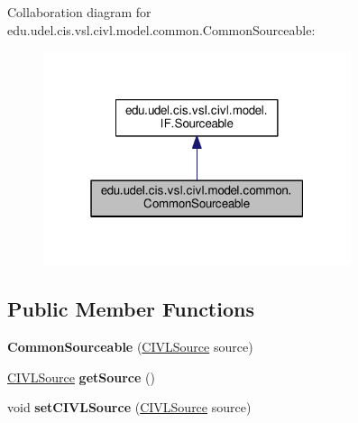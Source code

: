 Collaboration diagram for edu.\+udel.\+cis.\+vsl.\+civl.\+model.\+common.\+Common\+Sourceable\+:
\nopagebreak
\begin{figure}[H]
\begin{center}
\leavevmode
\includegraphics[width=256pt]{classedu_1_1udel_1_1cis_1_1vsl_1_1civl_1_1model_1_1common_1_1CommonSourceable__coll__graph}
\end{center}
\end{figure}
\subsection*{Public Member Functions}
\begin{DoxyCompactItemize}
\item 
\hypertarget{classedu_1_1udel_1_1cis_1_1vsl_1_1civl_1_1model_1_1common_1_1CommonSourceable_a4773184c9e41cb1edc368ea9176e0507}{}{\bfseries Common\+Sourceable} (\hyperlink{interfaceedu_1_1udel_1_1cis_1_1vsl_1_1civl_1_1model_1_1IF_1_1CIVLSource}{C\+I\+V\+L\+Source} source)\label{classedu_1_1udel_1_1cis_1_1vsl_1_1civl_1_1model_1_1common_1_1CommonSourceable_a4773184c9e41cb1edc368ea9176e0507}

\item 
\hypertarget{classedu_1_1udel_1_1cis_1_1vsl_1_1civl_1_1model_1_1common_1_1CommonSourceable_a579b213dc544dd5b53e21aa52bee0ac7}{}\hyperlink{interfaceedu_1_1udel_1_1cis_1_1vsl_1_1civl_1_1model_1_1IF_1_1CIVLSource}{C\+I\+V\+L\+Source} {\bfseries get\+Source} ()\label{classedu_1_1udel_1_1cis_1_1vsl_1_1civl_1_1model_1_1common_1_1CommonSourceable_a579b213dc544dd5b53e21aa52bee0ac7}

\item 
\hypertarget{classedu_1_1udel_1_1cis_1_1vsl_1_1civl_1_1model_1_1common_1_1CommonSourceable_a2b843def73e193bd3ddb1efab5596fec}{}void {\bfseries set\+C\+I\+V\+L\+Source} (\hyperlink{interfaceedu_1_1udel_1_1cis_1_1vsl_1_1civl_1_1model_1_1IF_1_1CIVLSource}{C\+I\+V\+L\+Source} source)\label{classedu_1_1udel_1_1cis_1_1vsl_1_1civl_1_1model_1_1common_1_1CommonSourceable_a2b843def73e193bd3ddb1efab5596fec}

\end{DoxyCompactItemize}


